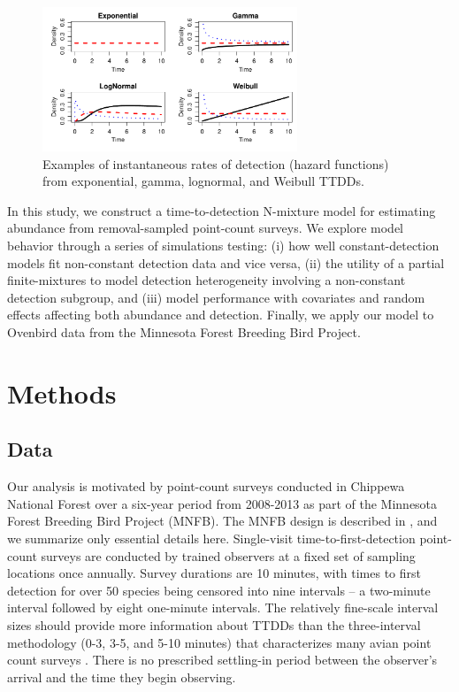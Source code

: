 \documentclass[useAMS,usenatbib,referee,12pt]{article}
\begin{document}
\begin{figure}[h!]\centering
\includegraphics[width=0.68\textwidth]{Hazards}
\caption{Examples of instantaneous rates of detection (hazard functions) from exponential, gamma, lognormal, and Weibull TTDDs.}
\label{HazardFxns}
\end{figure}

In this study, we construct a time-to-detection N-mixture model for estimating abundance from removal-sampled point-count surveys.  
We explore model behavior through a series of simulations testing: (i) how well constant-detection models fit non-constant detection data and vice versa, (ii) the utility of a partial finite-mixtures to model detection heterogeneity involving a non-constant detection subgroup, and (iii) model performance with covariates and random effects affecting both abundance and detection.  
Finally, we apply our model to Ovenbird data from the Minnesota Forest Breeding Bird Project.




\section{Methods}\label{sec:model}

\subsection{Data}\label{sec:data}

Our analysis is motivated by point-count surveys conducted in Chippewa National Forest over a six-year period from 2008-2013 as part of the Minnesota Forest Breeding Bird Project (MNFB).  
The MNFB design is described in \citet{Hanowski1995}, and we summarize only essential details here.  
Single-visit time-to-first-detection point-count surveys are conducted by trained observers at a fixed set of sampling locations once annually.  
Survey durations are 10 minutes, with times to first detection for over 50 species being censored into nine intervals -- a two-minute interval followed by eight one-minute intervals.  
The relatively fine-scale interval sizes should provide more information about TTDDs than the three-interval methodology (0-3, 3-5, and 5-10 minutes) that characterizes many avian point count surveys \citep{Ralph1995}.
There is no prescribed settling-in period between the observer's arrival and the time they begin observing.  
\end{document}
